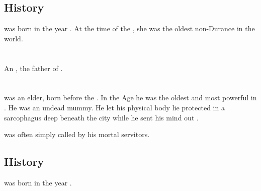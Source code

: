 \subsection{History}
\Hesherritan was born in the year . 
At the time of the \thirdbanewar, she was the oldest non-Durance \ophidian in the world.















\section{\HesodNerga}
\index{\HesodNerga}
An \ophidian{}, the father of .
















\section{\Ishtacca}
\index{\Ishtacca}
\Ishtacca was an \ophidian elder, born before the \firstbanewar. 
In the \Scatha Age he was the oldest and most powerful \ophidian in . 
He was an undead mummy.
He let his physical body lie protected in a sarcophagus deep beneath the city while he sent his mind out .

\Ishtacca was often simply called  by his mortal servitors. 









\subsection{History}
\Ishtacca was born in the year .









